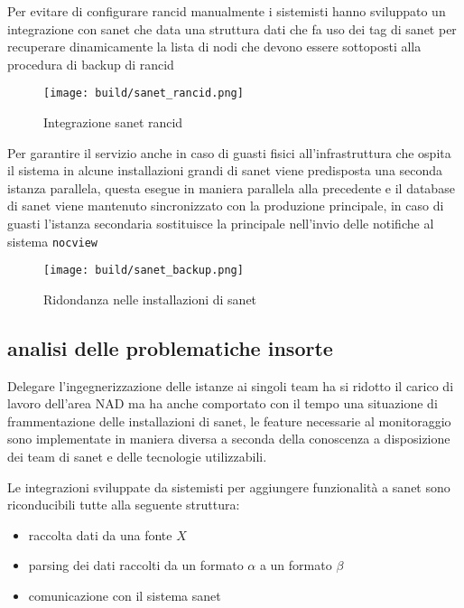 Per evitare di configurare rancid manualmente i sistemisti hanno sviluppato un integrazione con sanet che data una struttura dati che fa uso dei tag di sanet per recuperare dinamicamente la lista di nodi che devono essere sottoposti alla procedura di backup di rancid

\begin{figure}[H]
    \centering
    \texttt{[image: build/sanet\_rancid.png]}
    \caption{Integrazione sanet rancid}
    \label{fig:enter-label}
\end{figure}

Per garantire il servizio anche in caso di guasti fisici all'infrastruttura che ospita il sistema in alcune installazioni grandi di sanet viene predisposta una seconda istanza parallela, questa esegue in maniera parallela alla precedente e il database di sanet viene mantenuto sincronizzato con la produzione principale, in caso di guasti l'istanza secondaria sostituisce la principale nell'invio delle notifiche al sistema \verb|nocview|

\begin{figure}[H]
    \centering
    \texttt{[image: build/sanet\_backup.png]}
    \caption{Ridondanza nelle installazioni di sanet}
    \label{fig:enter-label}
\end{figure}

\subsection{analisi delle problematiche insorte}

Delegare l'ingegnerizzazione delle istanze ai singoli team ha si ridotto il carico di lavoro dell'area NAD ma ha anche comportato con il tempo una situazione di frammentazione delle installazioni di sanet, le feature necessarie al monitoraggio sono implementate in maniera diversa a seconda della conoscenza a disposizione dei team di sanet e delle tecnologie utilizzabili.

Le integrazioni sviluppate da sistemisti per aggiungere funzionalità a sanet sono riconducibili tutte alla seguente struttura:

\begin{itemize}
  \item{raccolta dati da una fonte \(X\)}
  \item{parsing dei dati raccolti da un formato \(\alpha\) a un formato \(\beta\)}
  \item{comunicazione con il sistema sanet}
\end{itemize}

